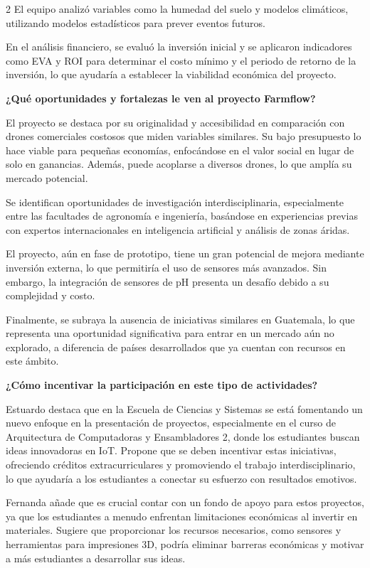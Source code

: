 \documentclass[12pt,spanish,Letterpaper,openany]{book}
\begin{document}
\begin {multicols}{2}
El equipo analizó variables como la humedad del suelo y modelos climáticos, utilizando modelos estadísticos para prever eventos futuros.

En el análisis financiero, se evaluó la inversión inicial y se aplicaron indicadores como EVA y ROI para determinar el costo mínimo y el periodo de retorno de la inversión, lo que ayudaría a establecer la viabilidad económica del proyecto.

\textbf{¿Qué oportunidades y fortalezas le ven al proyecto Farmflow?}

El proyecto se destaca por su originalidad y accesibilidad en comparación con drones comerciales costosos que miden variables similares. Su bajo presupuesto lo hace viable para pequeñas economías, enfocándose en el valor social en lugar de solo en ganancias. Además, puede acoplarse a diversos drones, lo que amplía su mercado potencial.

Se identifican oportunidades de investigación interdisciplinaria, especialmente entre las facultades de agronomía e ingeniería, basándose en experiencias previas con expertos internacionales en inteligencia artificial y análisis de zonas áridas.

El proyecto, aún en fase de prototipo, tiene un gran potencial de mejora mediante inversión externa, lo que permitiría el uso de sensores más avanzados. Sin embargo, la integración de sensores de pH presenta un desafío debido a su complejidad y costo.

Finalmente, se subraya la ausencia de iniciativas similares en Guatemala, lo que representa una oportunidad significativa para entrar en un mercado aún no explorado, a diferencia de países desarrollados que ya cuentan con recursos en este ámbito.

\textbf{¿Cómo incentivar la participación en este tipo de actividades?}

Estuardo destaca que en la Escuela de Ciencias y Sistemas se está fomentando un nuevo enfoque en la presentación de proyectos, especialmente en el curso de Arquitectura de Computadoras y Ensambladores 2, donde los estudiantes buscan ideas innovadoras en IoT. Propone que se deben incentivar estas iniciativas, ofreciendo créditos extracurriculares y promoviendo el trabajo interdisciplinario, lo que ayudaría a los estudiantes a conectar su esfuerzo con resultados emotivos.

Fernanda añade que es crucial contar con un fondo de apoyo para estos proyectos, ya que los estudiantes a menudo enfrentan limitaciones económicas al invertir en materiales. Sugiere que proporcionar los recursos necesarios, como sensores y herramientas para impresiones 3D, podría eliminar barreras económicas y motivar a más estudiantes a desarrollar sus ideas.


\end{multicols}
\end{document}
